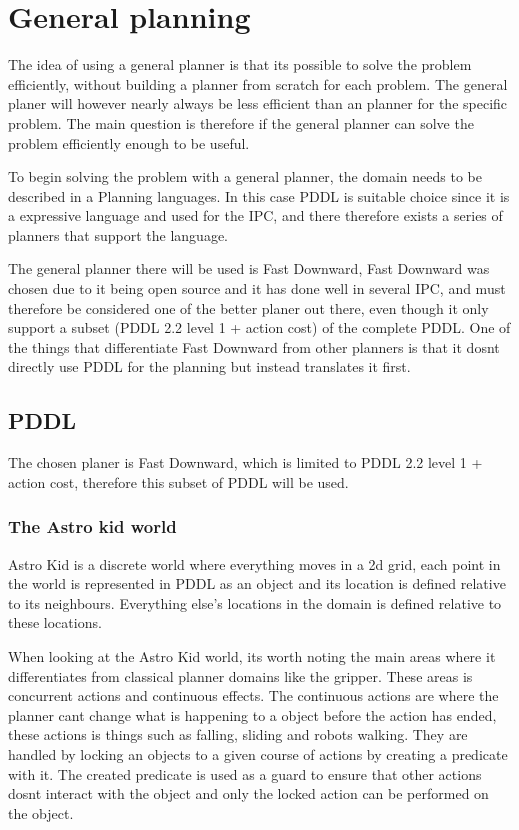 \section{General planning}
	The idea of using a general planner is that its possible to solve the problem efficiently, without building a planner from scratch for each problem. The general planer will however nearly always be less efficient than an planner for the specific problem. %
	The main question is therefore if the general planner can solve the problem efficiently enough to be useful.

	To begin solving the problem with a general planner, the domain needs to be described in a Planning languages. In this case PDDL is suitable choice since it is a expressive language and used for the IPC, and there therefore exists a series of planners that support the language.
 

	  
	
	The general planner there will be used is Fast Downward, Fast Downward was chosen due to it being open source and it has done well in several IPC, and must therefore be considered one of the better planer out there, even though it only support a subset (PDDL 2.2 level 1 + action cost) of the complete PDDL.
	One of the things that differentiate Fast Downward from other planners is that it dosnt directly use PDDL for the planning but instead translates it first. 
 
 \subsection{PDDL}
	
	The chosen planer is Fast Downward, which is limited to PDDL 2.2 level 1 + action cost, therefore this subset of PDDL will be used.

	\subsubsection{The Astro kid world}
	Astro Kid is a discrete world where everything moves in a 2d grid, each point in the world is represented in PDDL as an object and its location is defined relative to its neighbours. Everything else's locations in the domain is defined relative to these locations.
	
	
	When looking at the Astro Kid world, its worth noting the main areas where it differentiates from classical planner domains like the gripper. These areas is concurrent actions and continuous effects. 
	The continuous actions are where the planner cant change what is happening to a object before the action has ended, these actions is things such as falling, sliding and robots walking. They are handled by locking an objects to a given course of actions by creating a predicate with it. The created predicate is used as a guard to ensure that other actions dosnt interact with the object and only the locked action can be performed on the object.
	
